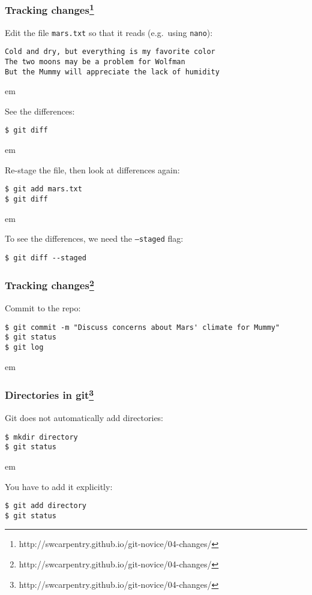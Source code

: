 \documentclass{beamer}
\begin{document}
\begin{frame}[fragile]
  \frametitle{Tracking changes\footnote{http://swcarpentry.github.io/git-novice/04-changes/}}

Edit the file \texttt{mars.txt} so that it reads (e.g.~using \texttt{nano}):
\begin{verbatim}
Cold and dry, but everything is my favorite color
The two moons may be a problem for Wolfman
But the Mummy will appreciate the lack of humidity
\end{verbatim}
 em
\pause

See the differences:
\begin{verbatim}
$ git diff
\end{verbatim}
 em
\pause

Re-stage the file, then look at differences again:
\begin{verbatim}
$ git add mars.txt
$ git diff
\end{verbatim}
 em
\pause

To see the differences, we need the \texttt{--staged} flag:
\begin{verbatim}
$ git diff --staged
\end{verbatim}

\end{frame}

\begin{frame}[fragile]
  \frametitle{Tracking changes\footnote{http://swcarpentry.github.io/git-novice/04-changes/}}


Commit to the repo:
\begin{verbatim}
$ git commit -m "Discuss concerns about Mars' climate for Mummy"
$ git status
$ git log
\end{verbatim}
 em
\pause

\end{frame}


\begin{frame}[fragile]
  \frametitle{Directories in git\footnote{http://swcarpentry.github.io/git-novice/04-changes/}}

Git does not automatically add directories:
\begin{verbatim}
$ mkdir directory
$ git status
\end{verbatim}
\pause
{} em

You have to add it explicitly:
\begin{verbatim}
$ git add directory
$ git status
\end{verbatim}

\end{frame}
\end{document}
